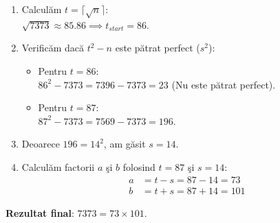 \documentclass[12pt, a4paper]{article}
\begin{document}
\begin{enumerate}
    \item Calcul\u{a}m $t = \lceil\sqrt{n}\rceil$: \\
    $\sqrt{7373} \approx 85.86 \implies t_{start} = 86$.
    \item Verific\u{a}m dac\u{a} $t^2 - n$ este p\u{a}trat perfect ($s^2$):
    \begin{itemize}
        \item Pentru $t = 86$: \\
        $86^2 - 7373 = 7396 - 7373 = 23$ (Nu este p\u{a}trat perfect).
        \item Pentru $t = 87$: \\
        $87^2 - 7373 = 7569 - 7373 = 196$.
    \end{itemize}
    \item Deoarece $196 = 14^2$, am g\u{a}sit $s = 14$.
    \item Calcul\u{a}m factorii $a$ \c{s}i $b$ folosind $t = 87$ \c{s}i $s = 14$:
    \begin{align*}
        a &= t - s = 87 - 14 = 73 \\
        b &= t + s = 87 + 14 = 101
    \end{align*}
\end{enumerate}

\textbf{Rezultat final}: $7373 = 73 \times 101$.
\end{document}
